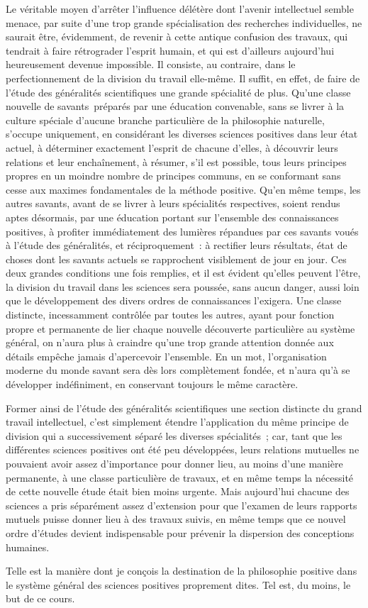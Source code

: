 \documentclass[french,twoside]{book} %
\begin{document}
Le véritable moyen d’arrêter l’influence délétère dont l’avenir intellectuel semble menace, par suite d’une trop grande spécialisation des recherches individuelles, ne saurait être, évidemment, de revenir à cette antique confusion des travaux, qui tendrait à faire rétrograder l’esprit humain, et qui est d’ailleurs aujourd’hui heureusement devenue impossible. Il consiste, au contraire, dans le perfectionnement de la division du travail elle-même. Il suffit, en effet, de faire de l’étude des généralités scientifiques une grande spécialité de plus. Qu’une classe nouvelle de savants préparés par une éducation convenable, sans se livrer à la culture spéciale d’aucune branche particulière de la philosophie naturelle, s’occupe uniquement, en considérant les diverses sciences positives dans leur état actuel, à déterminer exactement l’esprit de chacune d’elles, à découvrir leurs relations et leur enchaînement, à résumer, s’il est possible, tous leurs principes propres en un moindre nombre de principes communs, en se conformant sans cesse aux maximes fondamentales de la méthode positive. Qu’en même temps, les autres savants, avant de se livrer à leurs spécialités respectives, soient rendus aptes désormais, par une éducation portant sur l’ensemble des connaissances positives, à profiter immédiatement des lumières répandues par ces savants voués à l’étude des généralités, et réciproquement : à rectifier leurs résultats, état de choses dont les savants actuels se rapprochent visiblement de jour en jour. Ces deux grandes conditions une fois remplies, et il est évident qu’elles peuvent l’être, la division du travail dans les sciences sera poussée, sans aucun danger, aussi loin que le développement des divers ordres de connaissances l’exigera. Une classe distincte, incessamment contrôlée par toutes les autres, ayant pour fonction propre et permanente de lier chaque nouvelle découverte particulière au système général, on n’aura plus à craindre qu’une trop grande attention donnée aux détails empêche jamais d’apercevoir l’ensemble. En un mot, l’organisation moderne du monde savant sera dès lors complètement fondée, et n’aura qu’à se développer indéfiniment, en conservant toujours le même caractère.\par
Former ainsi de l’étude des généralités scientifiques une section distincte du grand travail intellectuel, c’est simplement étendre l’application du même principe de division qui a successivement séparé les diverses spécialités ; car, tant que les différentes sciences positives ont été peu développées, leurs relations mutuelles ne pouvaient avoir assez d’importance pour donner lieu, au moins d’une manière permanente, à une classe particulière de travaux, et en même temps la nécessité de cette nouvelle étude était bien moins urgente. Mais aujourd’hui chacune des sciences a pris séparément assez d’extension pour que l’examen de leurs rapports mutuels puisse donner lieu à des travaux suivis, en même temps que ce nouvel ordre d’études devient indispensable pour prévenir la dispersion des conceptions humaines.\par
Telle est la manière dont je conçois la destination de la philosophie positive dans le système général des sciences positives proprement dites. Tel est, du moins, le but de ce cours.
\end{document}
